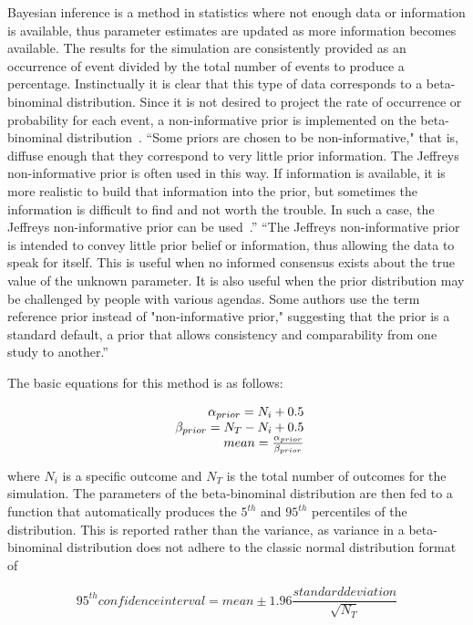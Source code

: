 Bayesian inference is a method in statistics where not enough data or information is 
available, thus parameter estimates are updated as more information becomes available. 
The results for the simulation are consistently provided as an occurrence of event 
divided by the total number of events to produce a percentage. Instinctually it is 
clear that this type of data corresponds to a beta-binominal distribution.  
Since it is not desired to project the rate of occurrence or probability for each event,
 a non-informative prior is implemented on the beta-binominal distribution~\cite{stat}.
``Some priors are chosen to be non-informative," that is, diffuse enough that they correspond 
to very little prior information. The Jeffreys non-informative prior is often used in this way. 
If information is available, it is more realistic to build that information into the prior, 
but sometimes the information is difficult to find and not worth the trouble. 
In such a case, the Jeffreys non-informative prior can be used~\cite{NUREGCR6823}.''
``The Jeffreys non-informative prior is intended to convey little prior belief or information, 
thus allowing the data to speak for itself. This is useful when no informed consensus exists 
about the true value of the unknown parameter. It is also useful when the prior distribution 
may be challenged by people with various agendas. Some authors use the term reference prior 
instead of "non-informative prior," suggesting that the prior is a standard default, a prior 
that allows consistency and comparability from one study to another.''

The basic equations for this method is as follows:

\begin{equation}
  \begin{array}{r@{}l}
    \alpha_{prior} = N_i + 0.5                     \\
    \beta_{prior} = N_T - N_i + 0.5                \\
    mean = \frac{\alpha_{prior}}{\beta_{prior}}
  \label{eq:priorDef}
  \end{array}
\end{equation}
  
where $N_i$ is a specific outcome and $N_T$ is the total number of outcomes for the simulation. 
The parameters of the beta-binominal distribution are then fed to a function that automatically 
produces the $5^{th}$ and $95^{th}$ percentiles of the distribution.  This is reported rather than the 
variance, as variance in a beta-binominal distribution does not adhere to the classic normal 
distribution format of 

\begin{equation}
  95^{th} confidence interval = mean \pm 1.96 \frac{standard deviation}{\sqrt{N_T}}
  \label{eq:priorDef}
\end{equation}

